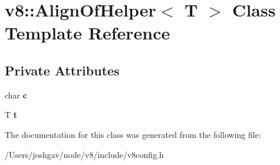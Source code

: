 \hypertarget{classv8_1_1_align_of_helper}{}\section{v8\+:\+:Align\+Of\+Helper$<$ T $>$ Class Template Reference}
\label{classv8_1_1_align_of_helper}
\subsection*{Private Attributes}
\begin{DoxyCompactItemize}
\item 
char {\bfseries c}\hypertarget{classv8_1_1_align_of_helper_ac23697d1381684b3f4a53f8ff0f29897}{}\label{classv8_1_1_align_of_helper_ac23697d1381684b3f4a53f8ff0f29897}

\item 
T {\bfseries t}\hypertarget{classv8_1_1_align_of_helper_aebba37d9841cf6fb72eaf24e2ba9e33a}{}\label{classv8_1_1_align_of_helper_aebba37d9841cf6fb72eaf24e2ba9e33a}

\end{DoxyCompactItemize}


The documentation for this class was generated from the following file\+:\begin{DoxyCompactItemize}
\item 
/\+Users/joshgav/node/v8/include/v8config.\+h\end{DoxyCompactItemize}

